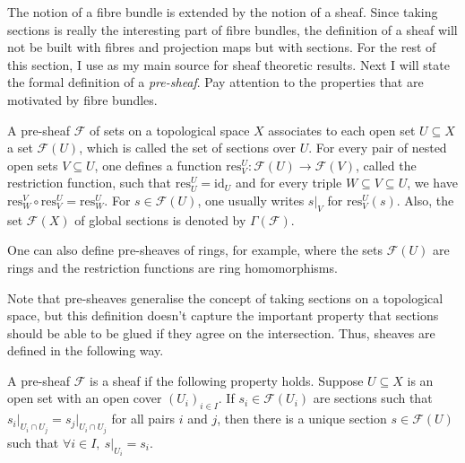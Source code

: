 The notion of a fibre bundle is extended by the notion of a sheaf.
Since taking sections is really the interesting part of fibre bundles, the
definition of a sheaf will not be built with fibres and projection maps
but with sections. For the rest of this section, I use \cite{gathmann} as
my main source for sheaf theoretic results. Next I will state the formal
definition of a \emph{pre-sheaf}. Pay attention to the properties that are
motivated by fibre bundles.
\begin{defin}
  A pre-sheaf $\mathscr{F}$ of sets on a topological space $X$ associates
  to each open set $U\subseteq X$ a set $\mathscr{F}(U)$, which is called
  the set of sections over $U$. For every pair of nested open sets
  $V\subseteq U$, one defines a function
  $\text{res}_{V}^{U}:\mathscr{F}(U)\to\mathscr{F}(V)$,
  called the restriction function, such that $\text{res}_{U}^{U}
  =\text{id}_{U}$ and for every triple $W\subseteq V\subseteq U$, we have
  $\text{res}_{W}^{V}\circ\text{res}_{V}^{U}=\text{res}_{W}^{U}$.
  For $s\in\mathscr{F}(U)$, one usually writes $s\vert_{V}$ for
  $\text{res}_{V}^{U}(s)$. Also, the set $\mathscr{F}(X)$ of global sections
  is denoted by $\Gamma(\mathscr{F})$.

  One can also define pre-sheaves of rings, for example, where the sets
  $\mathscr{F}(U)$ are rings and the restriction functions are
  ring homomorphisms.
\end{defin}
Note that pre-sheaves generalise the concept of taking sections on a
topological space, but this definition doesn't capture the important property
that sections should be able to be glued if they agree on the intersection.
Thus, sheaves are defined in the following way.
\begin{defin}
  A pre-sheaf $\mathscr{F}$ is a sheaf if the following property holds.
  Suppose $U\subseteq X$ is an open set with an open cover $(U_{i})_{i\in I}$.
  If $s_{i}\in\mathscr{F}(U_{i})$ are sections such that
  $s_{i}\vert_{U_{i}\cap U_{j}}=s_{j}\vert_{U_{i}\cap U_{j}}$ for all pairs $i$
  and $j$, then there is a unique section $s\in\mathscr{F}(U)$ such that
  $\forall i\in I,\ s\vert_{U_{i}}=s_{i}$.
\end{defin}
